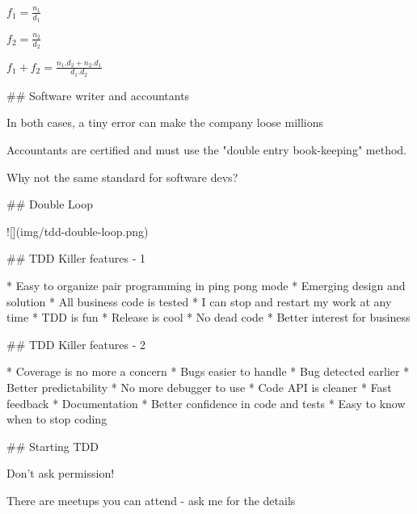 $f_1 = \frac{n_1}{d_1}$

$f_2 = \frac{n_2}{d_2}$

$f_1 + f_2 = \frac{n_1.d_2 + n_2.d_1}{d_1.d_2}$

## Software writer and accountants

In both cases, a tiny error can make the company loose millions

Accountants are certified and must use the "double entry book-keeping" method.

\vfill

Why not the same standard for software devs?

## Double Loop

![](img/tdd-double-loop.png)

## TDD Killer features - 1

* Easy to organize pair programming in ping pong mode
* Emerging design and solution
* All business code is tested
* I can stop and restart my work at any time
* TDD is fun
* Release is cool
* No dead code
* Better interest for business

## TDD Killer features - 2

* Coverage is no more a concern
* Bugs easier to handle
* Bug detected earlier
* Better predictability
* No more debugger to use
* Code API is cleaner
* Fast feedback
* Documentation
* Better confidence in code and tests
* Easy to know when to stop coding

## Starting TDD

Don't ask permission!

There are meetups you can attend - ask me
for the details
